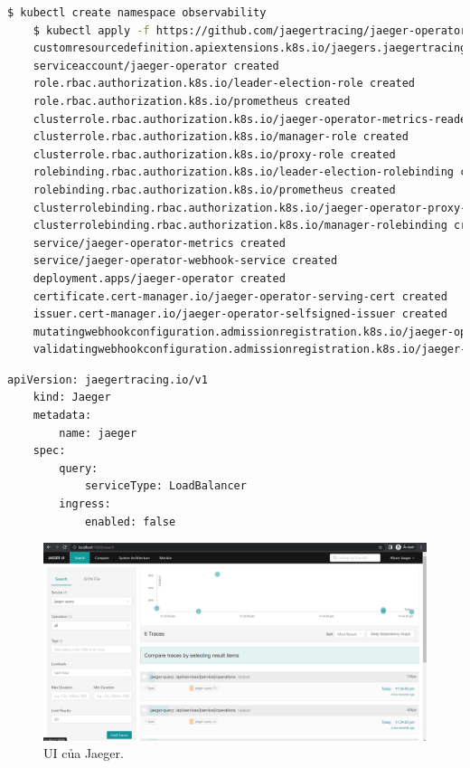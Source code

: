 \documentclass[12pt,a4paper]{report}
\begin{document}
	\begin{lstlisting}[language=Bash]
	$ kubectl create namespace observability
	$ kubectl apply -f https://github.com/jaegertracing/jaeger-operator/releases/download/v1.40.0/jaeger-operator.yaml
	customresourcedefinition.apiextensions.k8s.io/jaegers.jaegertracing.io created
	serviceaccount/jaeger-operator created
	role.rbac.authorization.k8s.io/leader-election-role created
	role.rbac.authorization.k8s.io/prometheus created
	clusterrole.rbac.authorization.k8s.io/jaeger-operator-metrics-reader created
	clusterrole.rbac.authorization.k8s.io/manager-role created
	clusterrole.rbac.authorization.k8s.io/proxy-role created
	rolebinding.rbac.authorization.k8s.io/leader-election-rolebinding created
	rolebinding.rbac.authorization.k8s.io/prometheus created
	clusterrolebinding.rbac.authorization.k8s.io/jaeger-operator-proxy-rolebinding created
	clusterrolebinding.rbac.authorization.k8s.io/manager-rolebinding created
	service/jaeger-operator-metrics created
	service/jaeger-operator-webhook-service created
	deployment.apps/jaeger-operator created
	certificate.cert-manager.io/jaeger-operator-serving-cert created
	issuer.cert-manager.io/jaeger-operator-selfsigned-issuer created
	mutatingwebhookconfiguration.admissionregistration.k8s.io/jaeger-operator-mutating-webhook-configuration created
	validatingwebhookconfiguration.admissionregistration.k8s.io/jaeger-operator-validating-webhook-configuration created
	\end{lstlisting}
	\hspace{1.0cm}{Tiếp theo, chúng ta sẽ tạo 1 tệp tin để tạo 1 ứng dụng Jaeger, pod loại Jaeger, ứng dụng này sẽ thu thập dữ liệu được gửi lên từ ứng dụng frontend và backend. Nội dung của tệp tin như sau:}
	\begin{lstlisting}[language=Bash]
	apiVersion: jaegertracing.io/v1
	kind: Jaeger
	metadata:
		name: jaeger
	spec:
		query:
			serviceType: LoadBalancer
		ingress:
			enabled: false
	\end{lstlisting}
	\begin{figure}[h]
		\centering
		\includegraphics[width=0.7\linewidth]{Pics/jaeger-ui}
		\caption{\label{fig:jaeger-ui} UI của Jaeger.}
		\label{fig:jaeger-ui}
	\end{figure}
\end{document}

